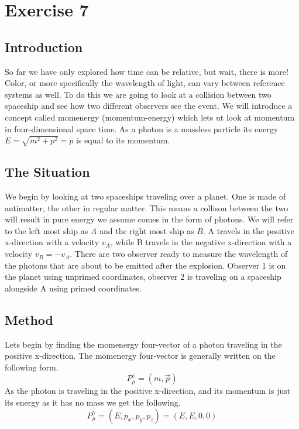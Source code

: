 \documentclass[reprint,english,notitlepage]{revtex4-2}
\begin{document}
\section{Exercise 7}

  \subsection{Introduction}
  So far we have only explored how time can be relative, but wait, there is more! Color, or more specifically the wavelength of light, can vary between reference systems as well. To do this we are going to look at a collision between two spaceship and see how two different observers see the event. We will introduce a concept called momenergy (momentum-energy) which lets ut look at momentum in four-dimensional space time. As a photon is a massless particle its energy $ E = \sqrt{m^{2} + p^{2}} = p  $ is equal to its momentum. 

  \subsection{The Situation}
  We begin by looking at two spaceships traveling over a planet. One is made of antimatter, the other in regular matter. This means a collison between the two will result in pure energy we assume comes in the form of photons. We will refer to the left most ship as $ A $ and the right most ship as $ B $. A travels in the positive x-direction with a velocity $ v_{A} $, while B travels in the negative x-direction with a velocity $ v_{B} = - v_{A} $. There are two observer ready to measure the wavelength of the photons that are about to be emitted after the explosion. Observer 1 is on the planet using unprimed coordinates, observer 2 is traveling on a spaceship alongside A using primed coordinates. 

  \subsection{Method}
  Lets begin by finding the momenergy four-vector of a photon traveling in the positive x-direction. The momenergy four-vector is generally written on the following form.
  \[
  P_{μ}^{γ} = (m,\vec{p})
  \]
  As the photon is traveling in the positive x-direction, and its momentum is just its energy as it has no mass we get the following. 
  \begin{equation}\label{eq: photon momenergy}
    P_{μ}^{γ} =  (E, p_{x}, p_{y}, p_{z}) = (E, E, 0, 0)
  \end{equation}
  
\end{document}
